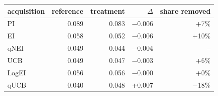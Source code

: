\begin{tabular}{lrrrr}
\toprule
acquisition & reference & treatment & $\Delta$ & share removed \\
\midrule
PI & 0.089 & 0.083 & $-$0.006 & +7\% \\
EI & 0.058 & 0.052 & $-$0.006 & +10\% \\
qNEI & 0.049 & 0.044 & $-$0.004 & -- \\
UCB & 0.049 & 0.047 & $-$0.003 & +6\% \\
LogEI & 0.056 & 0.056 & $-$0.000 & +0\% \\
qUCB & 0.040 & 0.048 & +0.007 & $-$18\% \\
\bottomrule
\end{tabular}
